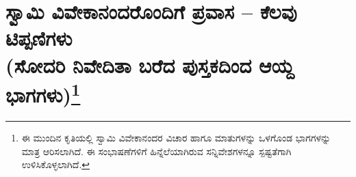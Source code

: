 
\chapter*{ಸ್ವಾಮಿ ವಿವೇಕಾನಂದರೊಂದಿಗೆ ಪ್ರವಾಸ – ಕೆಲವು ಟಿಪ್ಪಣಿಗಳು\\(ಸೋದರಿ ನಿವೇದಿತಾ ಬರೆದ ಪುಸ್ತಕದಿಂದ ಆಯ್ದ ಭಾಗಗಳು)\protect\footnote{ಈ ಮುಂದಿನ ಕೃತಿಯಲ್ಲಿ ಸ್ವಾಮಿ ವಿವೇಕಾನಂದರ ವಿಚಾರ ಹಾಗೂ ಮಾತುಗಳನ್ನು ಒಳಗೊಂಡ ಭಾಗಗಳನ್ನು ಮಾತ್ರ ಆರಿಸಲಾಗಿದೆ. ಈ ಸಂಭಾಷಣೆಗಳಿಗೆ ಹಿನ್ನೆಲೆಯಾಗಿರುವ ಸನ್ನಿವೇಶಗಳನ್ನೂ ಸ್ಪಷ್ಟತೆಗಾಗಿ ಉಳಿಸಿಕೊಳ್ಳಲಾಗಿದೆ.}}

